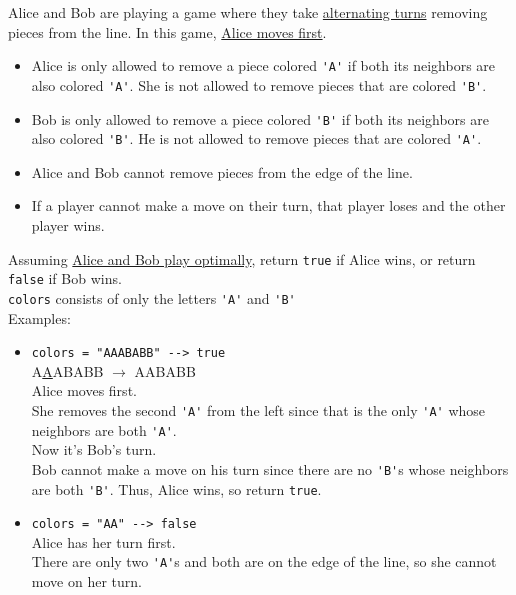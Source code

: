{Alice and Bob are playing a game where they take \ul{alternating turns} removing pieces from the line. In this game, \ul{Alice moves first}.

\begin{itemize}
\item Alice is only allowed to remove a piece colored {\colorbox{CodeBackground}{\lstinline|'A'|}} if both its neighbors are also colored {\colorbox{CodeBackground}{\lstinline|'A'|}}. She is not allowed to remove pieces that are colored {\colorbox{CodeBackground}{\lstinline|'B'|}}.
\item Bob is only allowed to remove a piece colored {\colorbox{CodeBackground}{\lstinline|'B'|}} if both its neighbors are also colored {\colorbox{CodeBackground}{\lstinline|'B'|}}. He is not allowed to remove pieces that are colored {\colorbox{CodeBackground}{\lstinline|'A'|}}.
\item Alice and Bob cannot remove pieces from the edge of the line.
\item If a player cannot make a move on their turn, that player loses and the other player wins.
\end{itemize}
Assuming \ul{Alice and Bob play optimally}, return {\colorbox{CodeBackground}{\lstinline|true|}} if Alice wins, or return {\colorbox{CodeBackground}{\lstinline|false|}} if Bob wins.\\

{\colorbox{CodeBackground}{\lstinline|colors|}} consists of only the letters {\colorbox{CodeBackground}{\lstinline|'A'|}} and {\colorbox{CodeBackground}{\lstinline|'B'|}}\\

Examples:
\begin{itemize}
\item {\colorbox{CodeBackground}{\lstinline|colors = "AAABABB" --> true|}}\\
A\ul{A}ABABB $\rightarrow$ AABABB\\
Alice moves first.\\
She removes the second {\colorbox{CodeBackground}{\lstinline|'A'|}} from the left since that is the only {\colorbox{CodeBackground}{\lstinline|'A'|}} whose neighbors are both {\colorbox{CodeBackground}{\lstinline|'A'|}}.\\

Now it's Bob's turn.\\
Bob cannot make a move on his turn since there are no {\colorbox{CodeBackground}{\lstinline|'B'|}}s whose neighbors are both {\colorbox{CodeBackground}{\lstinline|'B'|}}.
Thus, Alice wins, so return {\colorbox{CodeBackground}{\lstinline|true|}}.
\item {\colorbox{CodeBackground}{\lstinline|colors = "AA" --> false|}}\\
Alice has her turn first.\\
There are only two {\colorbox{CodeBackground}{\lstinline|'A'|}}s and both are on the edge of the line, so she cannot move on her turn.\\


\end{itemize}}
